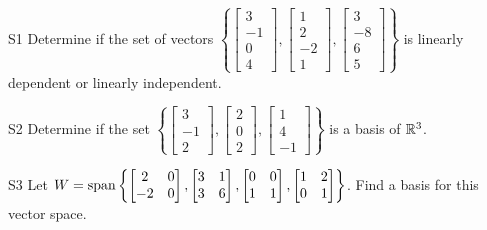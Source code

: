 \documentclass{sbgLAexam}
\begin{document}
\begin{problem}{S1}
Determine if the set of vectors $\left\{\begin{bmatrix} 3 \\ -1 \\ 0 \\ 4 \end{bmatrix}, \begin{bmatrix} 1  \\ 2 \\ -2 \\ 1 \end{bmatrix}, \begin{bmatrix} 3 \\ -8 \\ 6 \\ 5 \end{bmatrix} \right\}$  is linearly dependent or linearly independent.
\end{problem}

\begin{problem}{S2}
  Determine if the set \(\left\{
    \begin{bmatrix} 3 \\ -1 \\ 2 \end{bmatrix},
    \begin{bmatrix} 2 \\ 0 \\ 2 \end{bmatrix},
    \begin{bmatrix} 1 \\ 4 \\ -1 \end{bmatrix}
  \right\}\) is a basis of $\mathbb{R}^3$.
\end{problem}
\newpage

\begin{problem}{S3}
Let \(
  W={\rm span}\left\{
    \begin{bmatrix} 2 & 0 \\ -2 & 0 \end{bmatrix},
    \begin{bmatrix} 3 & 1 \\ 3 & 6 \end{bmatrix},
    \begin{bmatrix} 0 & 0 \\ 1 & 1 \end{bmatrix},
    \begin{bmatrix} 1 & 2 \\ 0 & 1 \end{bmatrix}
  \right\}
\). Find a basis for this vector space.
\end{problem}
\end{document}
